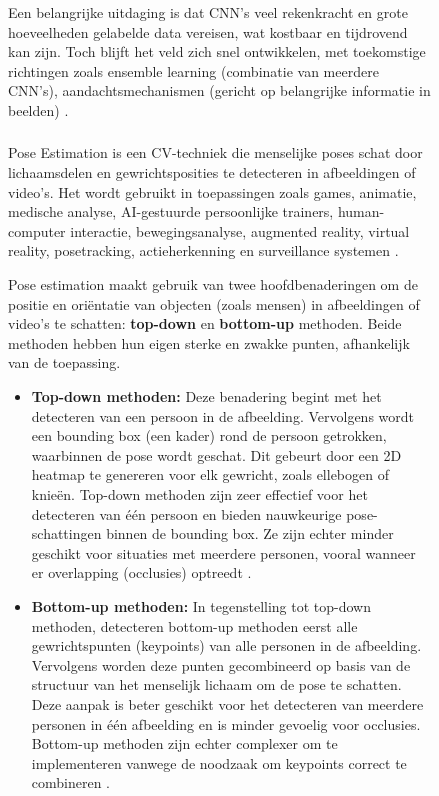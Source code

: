 \begin{figure}[h]
\medskip

Een belangrijke uitdaging is dat CNN's veel rekenkracht en grote hoeveelheden gelabelde data vereisen, wat kostbaar en tijdrovend kan zijn. 
Toch blijft het veld zich snel ontwikkelen, met toekomstige richtingen zoals ensemble learning (combinatie van meerdere CNN's), aandachtsmechanismen (gericht op belangrijke informatie in beelden) \autocite{ZhaoEtAl2024}. 

\subsubsection{}%
\label{subsubsec:pose-estimation}
 
Pose Estimation is een CV-techniek die menselijke poses schat door lichaamsdelen en gewrichtsposities te detecteren in afbeeldingen of video's. 
Het wordt gebruikt in toepassingen zoals games, animatie, medische analyse, AI-gestuurde persoonlijke trainers, human-computer interactie, bewegingsanalyse, augmented reality, virtual reality, posetracking, actieherkenning en surveillance systemen \autocite{SiddharthEtAl2021}.

\medskip

Pose estimation maakt gebruik van twee hoofdbenaderingen om de positie en oriëntatie van objecten (zoals mensen) in afbeeldingen of video's te schatten: \textbf{top-down} en \textbf{bottom-up} methoden. 
Beide methoden hebben hun eigen sterke en zwakke punten, afhankelijk van de toepassing.

\begin{itemize}
    \item \textbf{Top-down methoden:} 
    Deze benadering begint met het detecteren van een persoon in de afbeelding. 
    Vervolgens wordt een bounding box (een kader) rond de persoon getrokken, waarbinnen de pose wordt geschat. 
    Dit gebeurt door een 2D heatmap te genereren voor elk gewricht, zoals ellebogen of knieën. 
    Top-down methoden zijn zeer effectief voor het detecteren van één persoon en bieden nauwkeurige pose-schattingen binnen de bounding box. 
    Ze zijn echter minder geschikt voor situaties met meerdere personen, vooral wanneer er overlapping (occlusies) optreedt \autocite{LiuEtAl2022}.

    \item \textbf{Bottom-up methoden:} 
    In tegenstelling tot top-down methoden, detecteren bottom-up methoden eerst alle gewrichtspunten (keypoints) van alle personen in de afbeelding. 
    Vervolgens worden deze punten gecombineerd op basis van de structuur van het menselijk lichaam om de pose te schatten. 
    Deze aanpak is beter geschikt voor het detecteren van meerdere personen in één afbeelding en is minder gevoelig voor occlusies. 
    Bottom-up methoden zijn echter complexer om te implementeren vanwege de noodzaak om keypoints correct te combineren \autocite{BeomjunEtAl2022}.
\end{itemize}


\end{figure}
